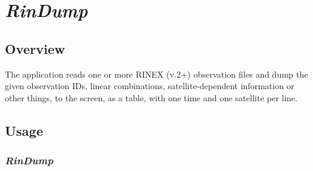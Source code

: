 %
%

\section{\emph{RinDump}}
\subsection{Overview}
The application reads one or more RINEX (v.2+) observation files and dump the given observation IDs, linear combinations, satellite-dependent information or other things, to the screen, as a table, with one time and one satellite per line.

\subsection{Usage}
\subsubsection{\emph{RinDump}}

